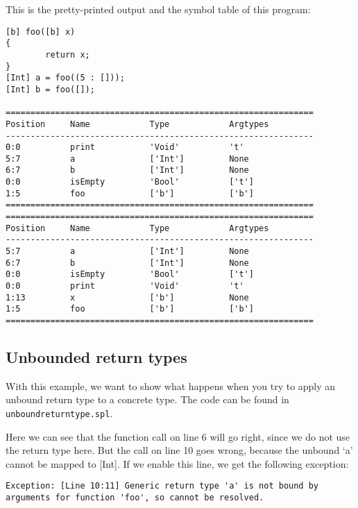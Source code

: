 \documentclass[a4paper]{article}
\begin{document}
This is the pretty-printed output and the symbol table of this program: 
\begin{verbatim}
[b] foo([b] x)
{
        return x;
}
[Int] a = foo((5 : []));
[Int] b = foo([]);

==============================================================
Position     Name            Type            Argtypes            
--------------------------------------------------------------
0:0          print           'Void'          't'                 
5:7          a               ['Int']         None                
6:7          b               ['Int']         None                
0:0          isEmpty         'Bool'          ['t']               
1:5          foo             ['b']           ['b']               
==============================================================
==============================================================
Position     Name            Type            Argtypes            
--------------------------------------------------------------
5:7          a               ['Int']         None                
6:7          b               ['Int']         None                
0:0          isEmpty         'Bool'          ['t']               
0:0          print           'Void'          't'                 
1:13         x               ['b']           None                
1:5          foo             ['b']           ['b']               
==============================================================
\end{verbatim}

\subsection{Unbounded return types}
With this example, we want to show what happens when you try to apply an unbound return type to a concrete type. The code can be found in {\tt unboundreturntype.spl}. 

Here we can see that the function call on line 6 will go right, since we do not use the return type here. But the call on line 10 goes wrong, because the unbound `a' cannot be mapped to [Int]. If we enable this line, we get the following exception: 

\begin{verbatim}
Exception: [Line 10:11] Generic return type 'a' is not bound by arguments for function 'foo', so cannot be resolved.
\end{verbatim}
\end{document}
